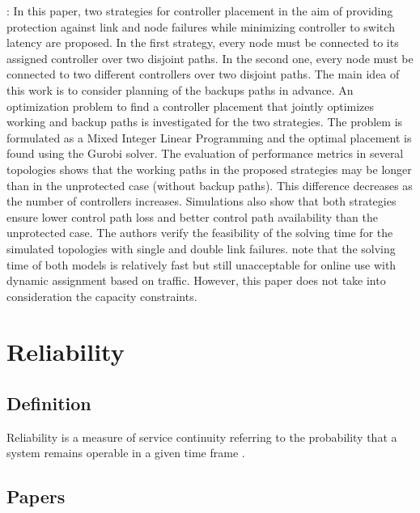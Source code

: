 \documentclass[a4paper,10pt]{article}
\begin{document}
\cite{ViMa16}: In this paper, two strategies for controller placement in the aim of providing protection against link and node failures while minimizing controller to switch latency  are proposed. In the first strategy, every node must be connected to its assigned controller over two disjoint paths. In the second one, every node must be connected to two different controllers over two disjoint paths. The main idea of this work is to consider planning of the backups paths in advance. An optimization problem to find a controller placement that jointly optimizes working and backup paths is investigated for the two strategies. The problem is formulated as a Mixed Integer Linear Programming and the optimal placement is found using the Gurobi solver. The evaluation of performance metrics in several topologies shows that the working paths in the proposed strategies may be longer than in the unprotected case (without backup paths). This difference decreases as the number of controllers increases. Simulations also show that both strategies ensure lower control path loss and better control path availability than the unprotected case. The authors verify the feasibility of the solving time for the simulated topologies with single and double link failures. note that the solving time of both models is relatively fast but still unacceptable for online use with dynamic assignment based on traffic. However, this paper does not take into consideration the capacity constraints.

\section{Reliability}
\subsection{Definition}
Reliability is a measure of service continuity referring to the probability that a system remains operable in a given time frame \cite{Rak15}. 



\subsection{Papers}
\end{document}
